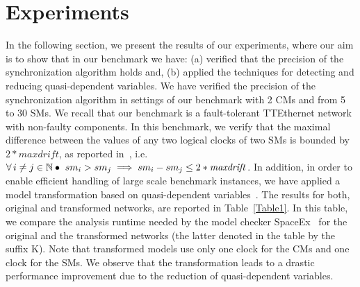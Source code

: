 \section{Experiments}
In the following section, we present the results of our experiments, where our aim is to show that
in our benchmark we have: (a) verified that the precision of the synchronization algorithm holds and, 
(b) applied the techniques for detecting and reducing quasi-dependent variables. 
We have verified the precision of the synchronization algorithm in settings of our benchmark with 2 CMs and from 5 to 30 SMs. 
We recall that our benchmark is a fault-tolerant TTEthernet network with non-faulty components. 
In this benchmark, we verify that the maximal difference between the values of any two logical clocks of two SMs is bounded by 
$2*\mathit{maxdrift}$, as reported in~\cite{Steiner2}, 
i.e.\ $\forall i\neq j\in\nat\bullet \ sm_i > sm_j \implies sm_i-sm_j \leq 2*\mathit{maxdrift} $.
%
In addition, in order to enable efficient handling of large scale
benchmark instances, we have applied a model transformation based on
quasi-dependent variables~\cite{Herrera3}. 
%
The results for both, original and transformed networks, are reported in 
Table~\ref{Table1}. In this table, we compare the analysis runtime needed by the model checker 
SpaceEx~\cite{Frehse,bogomolov-et-al-sttt2015,DBLP:conf/hvc/BogomolovFGGPPS14}
 for the original and the transformed networks (the latter denoted in the table by the suffix K). 
Note that transformed models use only one clock for the CMs and one clock for the SMs.
%
We observe that the transformation leads to a drastic performance improvement due to the reduction of quasi-dependent variables.   

  
